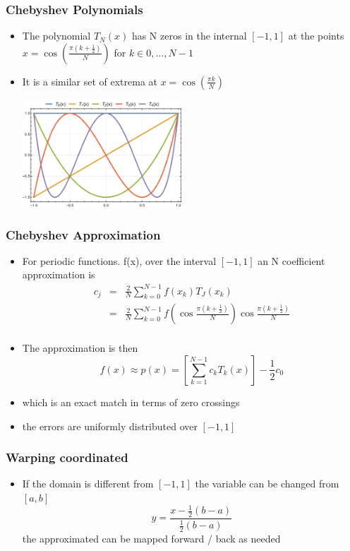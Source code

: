 \documentclass[10pt]{beamer}
\begin{document}
\begin{frame}
  \frametitle{Chebyshev Polynomials}
  \begin{itemize}
  \item The polynomial $T_N(x)$ has N zeros in the internal $[-1,1]$ at the points $x=\cos(\frac{\pi (k+\frac{1}{2})}{N})$ for $k \in 0, \ldots, N-1$
  \item It is a similar set of extrema at $x = \cos(\frac{\pi k}{N})$
    \centerline{\includegraphics[height=4cm]{Chebyshev}}
  \end{itemize}
\end{frame}

\begin{frame}
  \frametitle{Chebyshev Approximation}
  \begin{itemize}
  \item For periodic functions. f(x), over the interval $[-1,1]$ an N coefficient approximation is
    \[
      \begin{array}{rcl}
      c_j & = & \frac{2}{N} \sum_{k=0}^{N-1} f(x_k) T_J(x_k)\\
          & = & \frac{2}{N} \sum_{k=0}^{N-1} f\left( \cos \frac{\pi (k+\frac{1}{2})}{N} \right) \cos \frac{\pi (k+\frac{1}{2})}{N} \\
      \end{array}
    \]
  \item The approximation is then
    \[
      f(x) \approx p(x) = \left[ \sum_{k=1}^{N-1} c_k T_k(x) \right] - \frac{1}{2} c_0
    \]
  \item which is an exact match in terms of zero crossings
  \item the errors are uniformly distributed over $[-1,1]$
  \end{itemize}
\end{frame}

\begin{frame}
  \frametitle{Warping coordinated}
  \begin{itemize}
  \item If the domain is different from $[-1,1]$ the variable can be changed from $[a,b]$
    \[
      y = \frac{x -\frac{1}{2} (b-a)}{\frac{1}{2}(b-a)}
    \]
    the approximated can be mapped forward / back as needed
  \end{itemize}
\end{frame}
\end{document}
